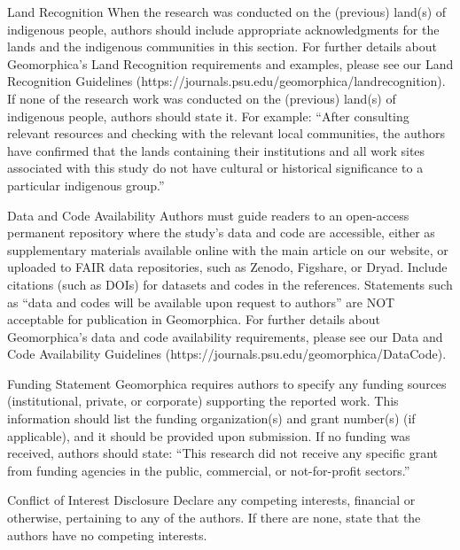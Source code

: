 \documentclass[titlepage]{geomorphica}
\begin{document}
\begin{closing}{Land Recognition}
	When the research was conducted on the (previous) land(s) of indigenous people, authors should include appropriate acknowledgments for the lands and the indigenous communities in this section. For further details about Geomorphica’s Land Recognition requirements and examples, please see our Land Recognition Guidelines (https://journals.psu.edu/geomorphica/landrecognition).
If none of the research work was conducted on the (previous) land(s) of indigenous people, authors should state it. For example:
“After consulting relevant resources and checking with the relevant local communities, the authors have confirmed that the lands containing their institutions and all work sites associated with this study do not have cultural or historical significance to a particular indigenous group.”
\end{closing}
\begin{closing}{Data and Code Availability}
	Authors must guide readers to an open-access permanent repository where the study's data and code are accessible, either as supplementary materials available online with the main article on our website, or uploaded to FAIR data repositories, such as Zenodo, Figshare, or Dryad. Include citations (such as DOIs) for datasets and codes in the references. Statements such as “data and codes will be available upon request to authors” are NOT acceptable for publication in Geomorphica.
For further details about Geomorphica’s data and code availability requirements, please see our Data and Code Availability Guidelines (https://journals.psu.edu/geomorphica/DataCode).
\end{closing}
\begin{closing}{Funding Statement}
	Geomorphica requires authors to specify any funding sources (institutional, private, or corporate) supporting the reported work. This information should list the funding organization(s) and grant number(s) (if applicable), and it should be provided upon submission. If no funding was received, authors should state: “This research did not receive any specific grant from funding agencies in the public, commercial, or not-for-profit sectors.”
\end{closing}
\begin{closing}{Conflict of Interest Disclosure}
	Declare any competing interests, financial or otherwise, pertaining to any of the authors. If there are none, state that the authors have no competing interests.
\end{closing}
\end{document}
